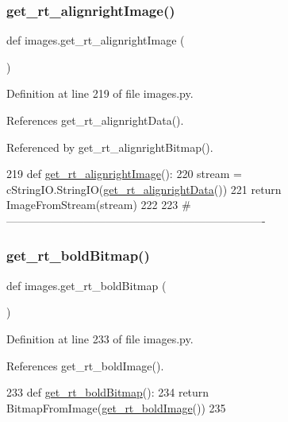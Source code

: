 \subsubsection{\texorpdfstring{get\+\_\+rt\+\_\+alignright\+Image()}{get\_rt\_alignrightImage()}}
{\footnotesize\ttfamily def images.\+get\+\_\+rt\+\_\+alignright\+Image (\begin{DoxyParamCaption}{ }\end{DoxyParamCaption})}



Definition at line 219 of file images.\+py.



References get\+\_\+rt\+\_\+alignright\+Data().



Referenced by get\+\_\+rt\+\_\+alignright\+Bitmap().


\begin{DoxyCode}
219 \textcolor{keyword}{def }\hyperlink{namespaceimages_a30f98db321746be49e7494a4468df4ea}{get\_rt\_alignrightImage}():
220     stream = cStringIO.StringIO(\hyperlink{namespaceimages_acf000e07da367236ad5320674525c7a5}{get\_rt\_alignrightData}())
221     \textcolor{keywordflow}{return} ImageFromStream(stream)
222 
223 \textcolor{comment}{#----------------------------------------------------------------------}
\end{DoxyCode}
\mbox{\label{namespaceimages_abc139a525ee8924fc0ec23529db44bc3}} 
\subsubsection{\texorpdfstring{get\+\_\+rt\+\_\+bold\+Bitmap()}{get\_rt\_boldBitmap()}}
{\footnotesize\ttfamily def images.\+get\+\_\+rt\+\_\+bold\+Bitmap (\begin{DoxyParamCaption}{ }\end{DoxyParamCaption})}



Definition at line 233 of file images.\+py.



References get\+\_\+rt\+\_\+bold\+Image().


\begin{DoxyCode}
233 \textcolor{keyword}{def }\hyperlink{namespaceimages_abc139a525ee8924fc0ec23529db44bc3}{get\_rt\_boldBitmap}():
234     \textcolor{keywordflow}{return} BitmapFromImage(\hyperlink{namespaceimages_a8feaea0f04eb5f48edbdd759828ba0ee}{get\_rt\_boldImage}())
235 
\end{DoxyCode}
\mbox{\label{namespaceimages_a1cee3c739bbfc2c6dceb14468f703c75}} 
